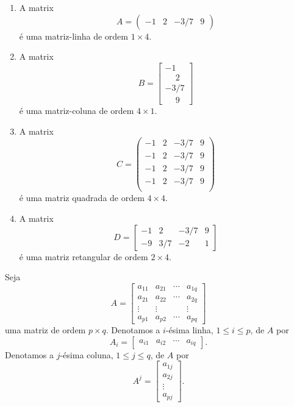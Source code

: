 \begin{exemplo}
	\begin{enumerate}
		\item A matrix
		\[
			A = \begin{pmatrix}
				-1 & 2 & -3/7 & 9
			\end{pmatrix}
		\]
		é uma matriz-linha de ordem $1 \times 4$.
		\item A matrix
		\[
			B = \begin{bmatrix}
				-1 \\ \phantom{-}2 \\ -3/7 \\ \phantom{-}9
			\end{bmatrix}
		\]
		é uma matriz-coluna de ordem $4 \times 1$.
		\item A matrix
		\[
			C = \begin{pmatrix}
				-1 & 2 & -3/7 & 9\\
				-1 & 2 & -3/7 & 9\\
				-1 & 2 & -3/7 & 9\\
				-1 & 2 & -3/7 & 9\\
			\end{pmatrix}
		\]
		é uma matriz quadrada de ordem $4 \times 4$.
		\item A matrix
		\[
			D = \begin{bmatrix}
				-1 & 2 & -3/7 & 9\\
				-9 & 3/7 & -2 & 1
			\end{bmatrix}
		\]
		é uma matriz retangular de ordem $2 \times 4$.
	\end{enumerate}
\end{exemplo}

Seja
\[
	A = \begin{bmatrix}
		a_{11} & a_{21} & \cdots & a_{1q}\\
		a_{21} & a_{22} & \cdots & a_{2q}\\
		\vdots & \vdots & & \vdots\\
		a_{p1} & a_{p2} & \cdots & a_{pq}
	\end{bmatrix}
\]
uma matriz de ordem $p\times q$. Denotamos a $i$-ésima linha, $1 \le i \le p$, de $A$ por
\[
	A_i = \begin{bmatrix}a_{i1} & a_{i2} & \cdots & a_{iq}\end{bmatrix}.
\]
Denotamos a $j$-ésima coluna, $1 \le j \le q$, de $A$ por
\[
	A^j = \begin{bmatrix}a_{1j} \\ a_{2j} \\ \vdots \\ a_{pj}\end{bmatrix}.
\]

